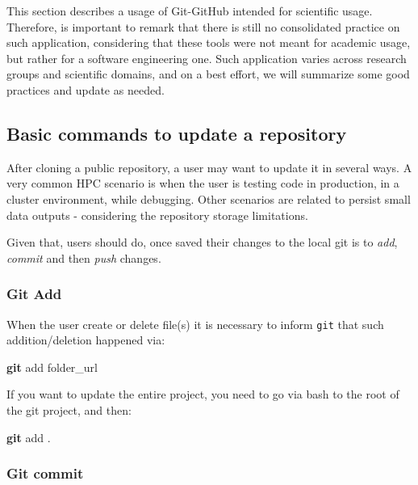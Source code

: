 \documentclass[
]{book}
\newenvironment{Shaded}{\begin{snugshade}}{\end{snugshade}}
\newcommand{\FunctionTok}[1]{\textcolor[rgb]{0.13,0.29,0.53}{\textbf{#1}}}
\newcommand{\NormalTok}[1]{#1}
\begin{document}
This section describes a usage of Git-GitHub intended for scientific usage. Therefore,
is important to remark that there is still no consolidated practice on such application,
considering that these tools were not meant for academic usage, but rather for a software
engineering one. Such application varies across research groups and scientific domains, and on a best effort, we will summarize some good practices and update as needed.

\hypertarget{basic-commands-to-update-a-repository}{%
\subsection{Basic commands to update a repository}\label{basic-commands-to-update-a-repository}}

After cloning a public repository, a user may want to update it in several ways.
A very common HPC scenario is when the user is testing code in production,
in a cluster environment, while debugging. Other scenarios are related to persist
small data outputs - considering the repository storage limitations.

Given that, users should do, once saved their changes to the local git is to
\emph{add}, \emph{commit} and then \emph{push} changes.

\hypertarget{git-add}{%
\subsubsection{Git Add}\label{git-add}}

When the user create or delete file(s) it is necessary to inform \texttt{git} that such
addition/deletion happened via:

\begin{Shaded}
\begin{Highlighting}[]
\FunctionTok{git}\NormalTok{ add folder\_url}
\end{Highlighting}
\end{Shaded}

If you want to update the entire project, you need to go via bash to the root of
the git project, and then:

\begin{Shaded}
\begin{Highlighting}[]
\FunctionTok{git}\NormalTok{ add .}
\end{Highlighting}
\end{Shaded}

\hypertarget{git-commit}{%
\subsubsection{Git commit}\label{git-commit}}
\end{document}
